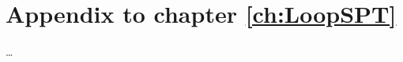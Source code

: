 \chapter{Appendix to chapter \ref{ch:LoopSPT}}\label{ch:mySecondAppendix}

\ldots




\cleardoublepage

